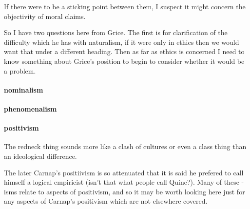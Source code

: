 \documentclass[10pt,titlepage]{book}
\newcommand{\ignore}[1]{}
\begin{document}
If there were to be a sticking point between them, I suspect it might concern the objectivity of moral claims.

So I have two questions here from Grice.
The first is for clarification of the difficulty which he has with naturalism, if it were only in ethics then we would want that under a different heading.
Then as far as ethics is concerned I need to know something about Grice's position to begin to consider whether it would be a problem. 

\paragraph{nominalism}

\ignore{
This must be a joke unless he is thinking of those ridiculous  
theories by Scheffler. Type/token Grice always used. He uses x to symbolise  
token, X to symbolise type. He may be objecting to an extensional treatment 
of  'classes'. Etc. He may be thinking of higher-order predicate-calculus 
where we  can substantivise over properties, etc. alla Strawson, Subject and 
predicate in  logic and grammar.
} 

\paragraph{phenomenalism}

\ignore{
This is the early early Grice and we know Carnap rejected  
this too. The opposite, Physicalism, actually scares me much more. I do love  
phenomenalism, even if inappropriate, as a good way of understanding the  
paintings of Picasso. He must be having in mind solipsism as a consequence of 
 phenomenalism, and the paradoxes of Berkeley brought to reality by Dr. 
Johnson  when kicking a stone.
}

\paragraph{positivism}

\ignore{
I should leave to Jones to expand on this. The antonym,  
negativism, is much more of a scarer. I think he must be meaning what he  
elsewhere calls, disrespectfully, the 'rednecks of Vienna' -- as if the sun  there 
were so strong! (I love Vienna).
}

The redneck thing sounds more like a clash of cultures or even a class thing than an ideological difference.

The later Carnap's positiivism is so attenuated that it is said he prefered to call himself a logical empiricist (isn't that what people call Quine?).
Many of these -isms relate to aspects of positivism, and so it may be worth looking here just for any aspects of Carnap's positivism which are not elsewhere covered.
\end{document}

